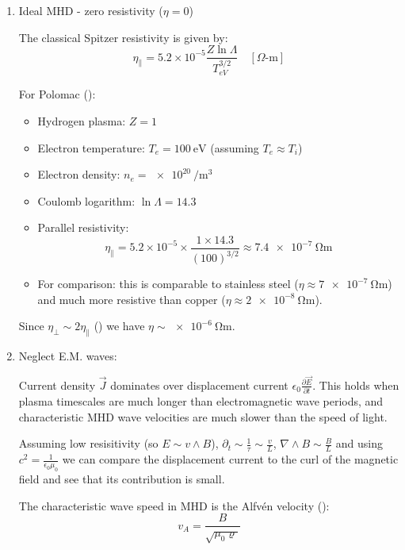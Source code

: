 \begin{enumerate}
This is again connected to the fact that we assume electrons can move very fast.

\item Ideal MHD - zero resistivity ($\eta = 0$)

The classical Spitzer resistivity \cite{Chen2016} is given by:
\begin{equation*}
    \eta_\parallel = 5.2 \times 10^{-5} \frac{Z \ln\Lambda}{T_{eV}^{3/2}} \quad [\Omega\text{-m}]
\end{equation*}

For Polomac (\cite{Elio2024}):
\begin{itemize}
    \item Hydrogen plasma: $Z = 1$
    \item Electron temperature: $T_e = \SI{100}{\electronvolt}$ (assuming $T_e \approx T_i$)
    \item Electron density: $n_e = \SI{e20}{\per\meter\cubed}$
    \item Coulomb logarithm: $\ln\Lambda = 14.3$
    \item Parallel resistivity: 
    \begin{equation*}
        \eta_\parallel = 5.2 \times 10^{-5} \times \frac{1 \times 14.3}{(100)^{3/2}} \approx \SI{7.4e-7}{\ohm\meter}
    \end{equation*}
    \item For comparison: this is comparable to stainless steel ($\eta \approx \SI{7e-7}{\ohm\meter}$) and much more resistive than copper ($\eta \approx \SI{2e-8}{\ohm\meter}$).
\end{itemize}

Since $\eta_\perp \sim 2 \eta_\parallel$ (\cite{Chen2016}) we have $\eta \sim \SI{e-6}{\ohm\meter}$.

\item Neglect E.M. waves:

Current density $\vec{J}$ dominates over displacement current $\epsilon_0 \frac{\partial \vec{E}}{\partial t}$.
This holds when plasma timescales are much longer than electromagnetic wave periods, and characteristic MHD wave velocities are much slower than the speed of light.

Assuming low resisitivity (so $E \sim v \wedge B$), $\partial_t \sim \frac{1}{\tau} \sim \frac{v}{L}$, $\nabla \wedge B \sim \frac{B}{L}$ and using $c^2 = \frac{1}{\epsilon_0 \mu_0}$
we can compare the displacement current to the curl of the magnetic field and see that its contribution is small.

The characteristic wave speed in MHD is the Alfvén velocity (\cite{Freidberg2014, Chen2016}):
\[
v_A = \frac{B}{\sqrt{\mu_0 \varrho}}
\]


\end{enumerate}
